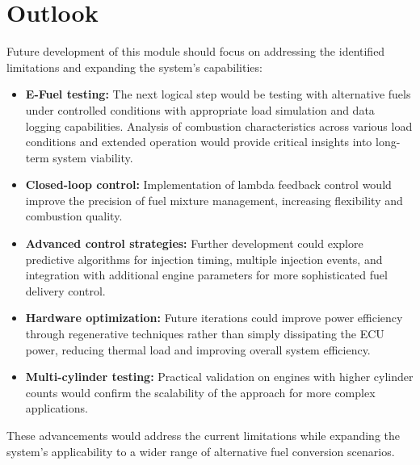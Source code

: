     \section{Outlook}

        Future development of this module should focus on addressing the identified limitations and expanding the system's capabilities:
        
        \begin{itemize}
            \item \textbf{E-Fuel testing:} The next logical step would be testing with alternative fuels under controlled conditions with appropriate load simulation and data logging capabilities. Analysis of combustion characteristics across various load conditions and extended operation would provide critical insights into long-term system viability.

            \item \textbf{Closed-loop control:} Implementation of lambda feedback control would improve the precision of fuel mixture management, increasing flexibility and combustion quality.

            \item \textbf{Advanced control strategies:} Further development could explore predictive algorithms for injection timing, multiple injection events, and integration with additional engine parameters for more sophisticated fuel delivery control.
            
            \item \textbf{Hardware optimization:} Future iterations could improve power efficiency through regenerative techniques rather than simply dissipating the ECU power, reducing thermal load and improving overall system efficiency.
            
            \item \textbf{Multi-cylinder testing:} Practical validation on engines with higher cylinder counts would confirm the scalability of the approach for more complex applications.
        \end{itemize}
        
        These advancements would address the current limitations while expanding the system's applicability to a wider range of alternative fuel conversion scenarios.

